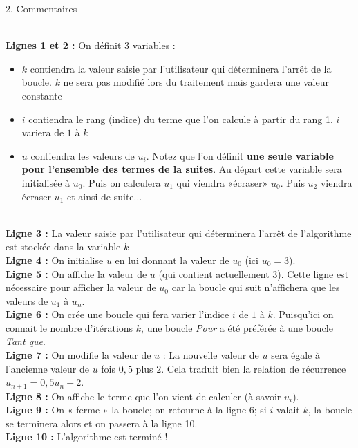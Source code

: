      \begin{h3}2. Commentaires\end{h3}
\\      \textbf{Lignes 1 et 2 : } On définit 3 variables :
     \begin{itemize}
          \item
          $k$ contiendra la valeur saisie par l'utilisateur qui déterminera l'arrêt de la boucle. $k$ ne sera pas modifié lors du traitement mais gardera une valeur constante
          \item
          $i$ contiendra le rang (indice) du terme que l'on calcule à partir du rang 1. $i$ variera de $1$ à $k$
          \item
          $u$ contiendra les valeurs de $u_{i}$. Notez que l'on définit \textbf{une seule variable pour l'ensemble des termes de la suites}. Au départ cette variable sera initialisée à $u_{0}$. Puis on calculera $u_{1}$ qui viendra «écraser» $u_{0}$. Puis $u_{2}$ viendra écraser $u_{1}$ et ainsi de suite...
     \end{itemize}
\\      \textbf{Ligne 3 :} La valeur saisie par l'utilisateur qui déterminera l'arrêt de l'algorithme est stockée dans la variable $k$
\\      \textbf{Ligne 4 :} On initialise $u$ en lui donnant la valeur de $u_{0}$ (ici $u_{0}=3$).
\\      \textbf{Ligne 5 :} On affiche la valeur de $u$ (qui contient actuellement $3$). Cette ligne est nécessaire pour afficher la valeur de $u_{0}$ car la boucle qui suit n'affichera que les valeurs de $u_{1}$ à $u_{n}$.
\\      \textbf{Ligne 6 :} On crée une boucle qui fera varier l'indice $i$ de $1$ à $k$. Puisqu'ici on connait le nombre d'itérations $k$, une boucle \textit{Pour} a été préférée à une boucle \textit{Tant que}.
\\      \textbf{Ligne 7 :} On modifie la valeur de $u$ : La nouvelle valeur de $u$ sera égale à l'ancienne valeur de $u$ fois $0,5$ plus $2$. Cela traduit bien la relation de récurrence  $u_{n+1}= 0,5u_{n}+2$.
\\      \textbf{Ligne 8 :} On affiche le terme que l'on vient de calculer (à savoir $u_{i}$).
\\      \textbf{Ligne 9 :} On « ferme » la boucle; on retourne à la ligne 6; si $i$ valait $k$, la boucle se terminera alors et  on passera à la ligne 10.
\\      \textbf{Ligne 10 :} L'algorithme est terminé !
